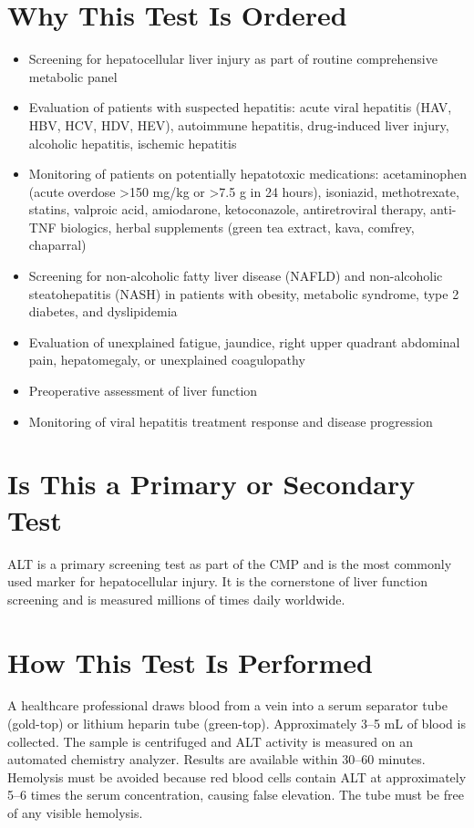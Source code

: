 \section*{Why This Test Is Ordered}
\begin{itemize}
  \item Screening for hepatocellular liver injury as part of routine comprehensive metabolic panel
  \item Evaluation of patients with suspected hepatitis: acute viral hepatitis (HAV, HBV, HCV, HDV, HEV), autoimmune hepatitis, drug-induced liver injury, alcoholic hepatitis, ischemic hepatitis
  \item Monitoring of patients on potentially hepatotoxic medications: acetaminophen (acute overdose >150 mg/kg or >7.5 g in 24 hours), isoniazid, methotrexate, statins, valproic acid, amiodarone, ketoconazole, antiretroviral therapy, anti-TNF biologics, herbal supplements (green tea extract, kava, comfrey, chaparral)
  \item Screening for non-alcoholic fatty liver disease (NAFLD) and non-alcoholic steatohepatitis (NASH) in patients with obesity, metabolic syndrome, type 2 diabetes, and dyslipidemia
  \item Evaluation of unexplained fatigue, jaundice, right upper quadrant abdominal pain, hepatomegaly, or unexplained coagulopathy
  \item Preoperative assessment of liver function
  \item Monitoring of viral hepatitis treatment response and disease progression
\end{itemize}

\section*{Is This a Primary or Secondary Test}
ALT is a primary screening test as part of the CMP and is the most commonly used marker for hepatocellular injury. It is the cornerstone of liver function screening and is measured millions of times daily worldwide.

\section*{How This Test Is Performed}
A healthcare professional draws blood from a vein into a serum separator tube (gold-top) or lithium heparin tube (green-top). Approximately 3--5 mL of blood is collected. The sample is centrifuged and ALT activity is measured on an automated chemistry analyzer. Results are available within 30--60 minutes. Hemolysis must be avoided because red blood cells contain ALT at approximately 5--6 times the serum concentration, causing false elevation. The tube must be free of any visible hemolysis.

